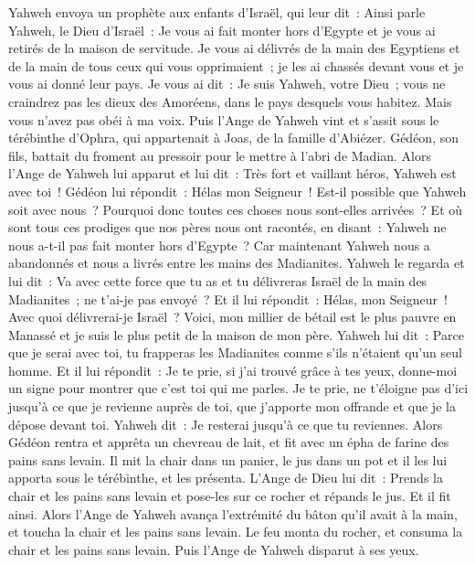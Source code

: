 \begin{multicols}{2}
Yahweh envoya un prophète aux enfants d'Israël, qui leur dit~: Ainsi parle Yahweh, le Dieu d'Israël~: Je vous ai fait monter hors d'Egypte et je vous ai retirés de la maison de servitude.
Je vous ai délivrés de la main des Egyptiens et de la main de tous ceux qui vous opprimaient~; je les ai chassés devant vous et je vous ai donné leur pays.
Je vous ai dit~: Je suis Yahweh, votre Dieu~; vous ne craindrez pas les dieux des Amoréens, dans le pays desquels vous habitez. Mais vous n'avez pas obéi à ma voix.
Puis l'Ange de Yahweh vint et s'assit sous le térébinthe d'Ophra, qui appartenait à Joas, de la famille d'Abiézer. Gédéon, son fils, battait du froment au pressoir pour le mettre à l'abri de Madian.
Alors l'Ange de Yahweh lui apparut et lui dit~: Très fort et vaillant héros, Yahweh est avec toi~!
Gédéon lui répondit~: Hélas mon Seigneur~! Est-il possible que Yahweh soit avec nous~? Pourquoi donc toutes ces choses nous sont-elles arrivées~? Et où sont tous ces prodiges que nos pères nous ont racontés, en disant~: Yahweh ne nous a-t-il pas fait monter hors d'Egypte~? Car maintenant Yahweh nous a abandonnés et nous a livrés entre les mains des Madianites.
Yahweh le regarda et lui dit~: Va avec cette force que tu as et tu délivreras Israël de la main des Madianites~; ne t'ai-je pas envoyé~?
Et il lui répondit~: Hélas, mon Seigneur~! Avec quoi délivrerai-je Israël~? Voici, mon millier de bétail est le plus pauvre en Manassé et je suis le plus petit de la maison de mon père.
Yahweh lui dit~: Parce que je serai avec toi, tu frapperas les Madianites comme s'ils n'étaient qu'un seul homme.
Et il lui répondit~: Je te prie, si j'ai trouvé grâce à tes yeux, donne-moi un signe pour montrer que c'est toi qui me parles.
Je te prie, ne t'éloigne pas d'ici jusqu'à ce que je revienne auprès de toi, que j'apporte mon offrande et que je la dépose devant toi. Yahweh dit~: Je resterai jusqu'à ce que tu reviennes.
Alors Gédéon rentra et apprêta un chevreau de lait, et fit avec un épha de farine des pains sans levain. Il mit la chair dans un panier, le jus dans un pot et il les lui apporta sous le térébinthe, et les présenta.
L'Ange de Dieu lui dit~: Prends la chair et les pains sans levain et pose-les sur ce rocher et répands le jus. Et il fit ainsi.
Alors l'Ange de Yahweh avança l'extrémité du bâton qu'il avait à la main, et toucha la chair et les pains sans levain. Le feu monta du rocher, et consuma la chair et les pains sans levain. Puis l'Ange de Yahweh disparut à ses yeux.

\end{multicols}
